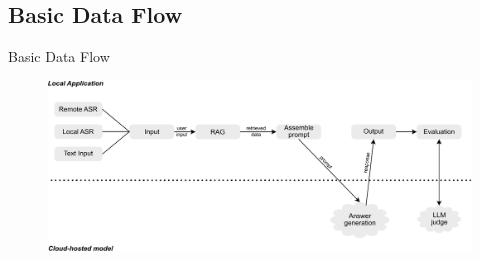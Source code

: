 \documentclass{sdqbeamer}[smallfoot]
\begin{document}
\subsection{Basic Data Flow}
\begin{frame}[t]{Basic Data Flow}
    \vspace{-1.5cm}
    \begin{figure}
        \centering
        \includegraphics[width=1.0\linewidth]{images/data_flow_basic.pdf}
    \end{figure}
\end{frame}
\end{document}

